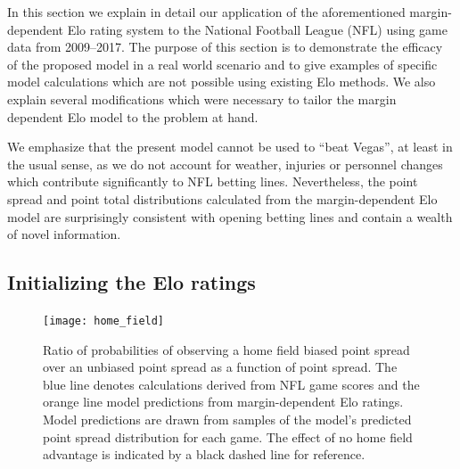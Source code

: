 \documentclass[aps,prc,reprint,amsmath,superscriptaddress,nofootinbib]{revtex4-1}
\begin{document}
In this section we explain in detail our application of the aforementioned margin-dependent Elo rating system to the National Football League (NFL) using game data from 2009--2017.
The purpose of this section is to demonstrate the efficacy of the proposed model in a real world scenario and to give examples of specific model calculations which are not possible using existing Elo methods.
We also explain several modifications which were necessary to tailor the margin dependent Elo model to the problem at hand.

We emphasize that the present model cannot be used to ``beat Vegas'', at least in the usual sense, as we do not account for weather, injuries or personnel changes which contribute significantly to NFL betting lines.
Nevertheless, the point spread and point total distributions calculated from the margin-dependent Elo model are surprisingly consistent with opening betting lines and contain a wealth of novel information.

\subsection{Initializing the Elo ratings}

\begin{figure}
  \texttt{[image: home\_field]}
  \caption{\label{fig:home_field} Ratio of probabilities of observing a home field biased point spread over an unbiased point spread as a function of point spread. The blue line denotes calculations derived from NFL game scores and the orange line model predictions from margin-dependent Elo ratings. Model predictions are drawn from samples of the model's predicted point spread distribution for each game. The effect of no home field advantage is indicated by a black dashed line for reference.}
\end{figure}
\end{document}
